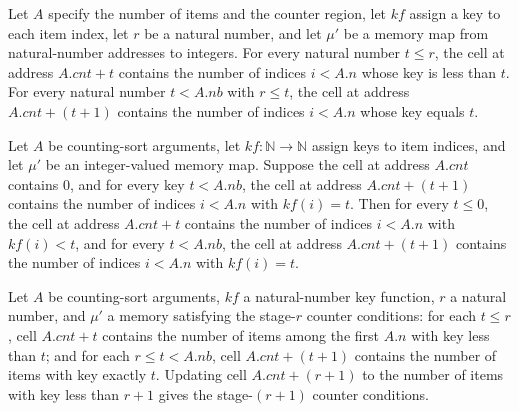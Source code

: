 \begin{definition}
\label{Light.CsSummed}
\leanok
{}
Let $A$ specify the number of items and the counter region, let $kf$ assign a key to
each item index, let $r$ be a natural number, and let $\mu'$ be a memory map from
natural-number addresses to integers. For every natural number $t\le r$, the cell at
address $A.cnt+t$ contains the number of indices $i<A.n$ whose key is less than $t$. For
every natural number $t<A.nb$ with $r\le t$, the cell at address $A.cnt+(t+1)$ contains
the number of indices $i<A.n$ whose key equals $t$.
\end{definition}

\begin{theorem}
\label{Light.CsSummed.start}
\leanok
{}
Let $A$ be counting-sort arguments, let $kf:\mathbb{N}\to\mathbb{N}$ assign keys to item
indices, and let $\mu'$ be an integer-valued memory map. Suppose the cell at address
$A.cnt$ contains $0$, and for every key $t<A.nb$, the cell at address $A.cnt+(t+1)$
contains the number of indices $i<A.n$ with $kf(i)=t$. Then for every $t\le 0$, the cell
at address $A.cnt+t$ contains the number of indices $i<A.n$ with $kf(i)<t$, and for
every $t<A.nb$, the cell at address $A.cnt+(t+1)$ contains the number of indices $i<A.n$
with $kf(i)=t$.
\end{theorem}

\begin{theorem}
\label{Light.CsSummed.succ}
\leanok
{}
Let $A$ be counting-sort arguments, $kf$ a natural-number key function, $r$ a natural
number, and $\mu\prime$ a memory satisfying the stage-$r$ counter conditions: for each
$t\le r$, cell $A.cnt+t$ contains the number of items among the first $A.n$ with key
less than $t$; and for each $r\le t<A.nb$, cell $A.cnt+(t+1)$ contains the number of
items with key exactly $t$. Updating cell $A.cnt+(r+1)$ to the number of items with key
less than $r+1$ gives the stage-$(r+1)$ counter conditions.
\end{theorem}

